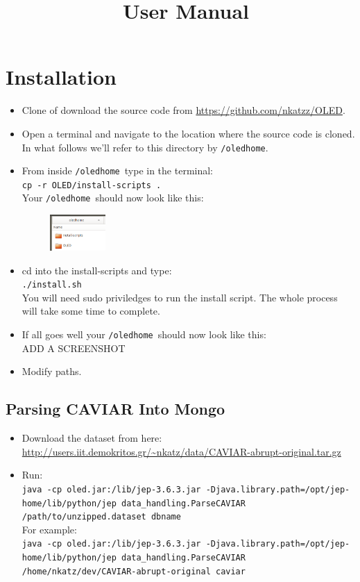 \documentclass[12pt]{article}
\title{\oled \  User Manual}
\newcommand{\home}{\texttt{/oledhome}}
\begin{document}
\maketitle

\section{Installation}

\begin{itemize}
\item Clone of download the source code from \url{https://github.com/nkatzz/OLED}. 
\item Open a terminal and navigate to the location where the source code is cloned. In what follows we'll refer to this directory by \home.
\item From inside \home \ type in the terminal: \\ \texttt{cp -r OLED/install-scripts .}\\
Your \home \ should now look like this:

\begin{figure}[h]
\centering
\includegraphics[width=0.2\textwidth]{./figures/oledhome-1}
\label{fig:oled_schema}
\end{figure}  

\item cd into the install-scripts and type:\\
\texttt{./install.sh}\\
You will need sudo priviledges to run the install script. The whole process will take some time to complete.
\item If all goes well your \home \ should now look like this:\\
ADD A SCREENSHOT
\item Modify paths.

\end{itemize}


\subsection*{Parsing CAVIAR Into Mongo}
\begin{itemize}
\item Download the dataset from here: \scriptsize
 \url{http://users.iit.demokritos.gr/~nkatz/data/CAVIAR-abrupt-original.tar.gz} \normalsize 
\item Run: \\
\scriptsize \texttt{java -cp oled.jar:/lib/jep-3.6.3.jar -Djava.library.path=/opt/jep-home/lib/python/jep data\_handling.ParseCAVIAR /path/to/unzipped.dataset dbname} \normalsize \\
For example: \\
\scriptsize \texttt{java -cp oled.jar:/lib/jep-3.6.3.jar -Djava.library.path=/opt/jep-home/lib/python/jep data\_handling.ParseCAVIAR /home/nkatz/dev/CAVIAR-abrupt-original caviar} \normalsize
\end{itemize}
\end{document}
